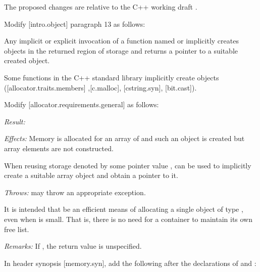 The proposed changes are relative to the C++ working draft \cite{N4910}. 

Modify [intro.object] paragraph 13 as follows:

\begin{adjustwidth}{0.5cm}{0.5cm}
Any implicit or explicit invocation of a function
named  or 
implicitly creates objects in the returned region of storage and
returns a pointer to a suitable created object.
\begin{note}
Some functions in the C++ standard library implicitly create objects ([allocator.traits.members] ,[c.malloc], [cstring.syn], [bit.cast]).
\end{note}

\end{adjustwidth}

Modify [allocator.requirements.general] as follows:

\begin{adjustwidth}{0.5cm}{0.5cm}

\emph{Result: }

\emph{Effects: }
Memory is allocated for an array of  
and such an object is created
but array elements are not constructed.
\begin{example}
When reusing storage denoted by some pointer value ,
can be used to implicitly create a suitable array object
and obtain a pointer to it.
\end{example}

\emph{Throws:}
 may throw an appropriate exception.

\begin{note}
It is intended that  be an efficient means
of allocating a single object of type , even when 
is small. That is, there is no need for a container to maintain its own
free list.
\end{note}

\emph{Remarks:}
If , the return value is unspecified.
\end{adjustwidth}

In header  synopsis [memory.syn], add the following after the declarations of  and :

